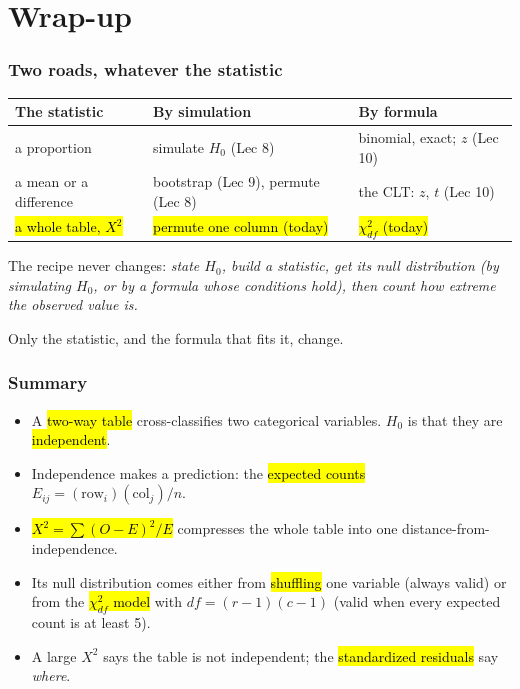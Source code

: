 \documentclass[slidestop,compress,mathserif]{beamer}
\begin{document}
\section{Wrap-up}
\begin{frame}
\frametitle{Two roads, whatever the statistic}

{\scriptsize
\begin{center}
\setlength{\tabcolsep}{4pt}
\begin{tabular}{lll}
\toprule
\textbf{The statistic} & \textbf{By simulation} & \textbf{By formula} \\
\midrule
a proportion & simulate $H_0$ (Lec 8) & binomial, exact; $z$ (Lec 10) \\
a mean or a difference & bootstrap (Lec 9), permute (Lec 8) & the CLT: $z$, $t$ (Lec 10) \\
\hl{a whole table, $X^2$} & \hl{permute one column (today)} & \hl{$\chi^2_{df}$ (today)} \\
\bottomrule
\end{tabular}
\end{center}}

\vspace{0.2em}
The recipe never changes: \emph{state $H_0$, build a statistic, get its null distribution (by simulating $H_0$, or by a formula whose conditions hold), then count how extreme the observed value is.}

\vspace{0.1em}
{\small Only the statistic, and the formula that fits it, change.}

\end{frame}

\begin{frame}
\frametitle{Summary}

\begin{itemize}
\item A \hl{two-way table} cross-classifies two categorical variables. $H_0$ is that they are \hl{independent}.
\item Independence makes a prediction: the \hl{expected counts} $E_{ij} = (\text{row}_i)(\text{col}_j)/n$.
\item \hl{$X^2 = \sum (O-E)^2/E$} compresses the whole table into one distance-from-independence.
\item Its null distribution comes either from \hl{shuffling} one variable (always valid) or from the \hl{$\chi^2_{df}$ model} with $df = (r-1)(c-1)$ (valid when every expected count is at least 5).
\item A large $X^2$ says the table is not independent; the \hl{standardized residuals} say \emph{where}.
\end{itemize}

\end{frame}
\end{document}

